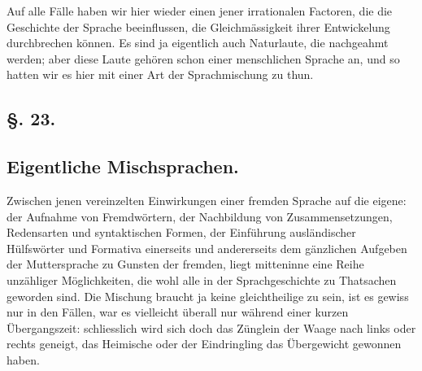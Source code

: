 {Auf alle Fälle haben wir hier wieder einen jener irrationalen Factoren, die die Geschichte der Sprache beeinflussen, die Gleichmässigkeit \label{fp.272} ihrer Entwickelung durchbrechen können. Es sind ja eigentlich auch Naturlaute, die nachgeahmt werden; aber diese Laute gehören schon einer menschlichen Sprache an, und so hatten wir es hier mit einer Art der Sprachmischung zu thun.

\subsection*{§. 23.}\label{III.II.II.23}
\subsection*{Eigentliche Mischsprachen.}
Zwischen jenen vereinzelten Einwirkungen einer fremden Sprache auf die eigene: der Aufnahme von Fremdwörtern, der Nachbildung von Zusammensetzungen, Redensarten und syntaktischen Formen, der Einführung ausländischer Hülfswörter und Formativa einerseits und andererseits dem gänzlichen Aufgeben der Muttersprache zu Gunsten der fremden, liegt mitteninne eine Reihe unzähliger Möglichkeiten, die wohl alle in der Sprachgeschichte zu Thatsachen geworden sind. Die Mischung braucht ja keine gleichtheilige zu sein, ist es gewiss nur in den  Fällen, war es vielleicht überall nur während einer kurzen Übergangszeit: schliesslich wird sich doch das Zünglein der Waage nach links oder rechts geneigt, das Heimische oder der Eindringling das Übergewicht gewonnen haben.

}
